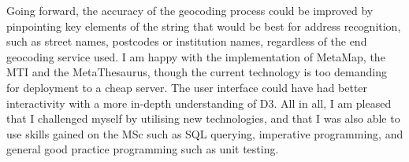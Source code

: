 \documentclass[Report.tex]{subfiles}
\begin{document}
\noindent Going forward, the accuracy of the geocoding process could be improved by pinpointing key elements of the string that would be best for address recognition, such as street names, postcodes or institution names, regardless of the end geocoding service used. I am happy with the implementation of MetaMap, the MTI and the MetaThesaurus, though the current technology is too demanding for deployment to a cheap server. The user interface could have had better interactivity with a more in-depth understanding of D3. All in all, I am pleased that I challenged myself by utilising new technologies, and that I was also able to use skills gained on the MSc such as SQL querying, imperative programming, and general good practice programming such as unit testing.
\end{document}
